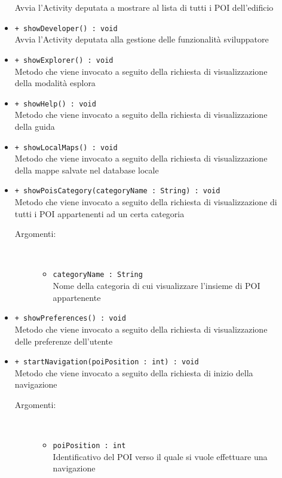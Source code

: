 \documentclass[../DefinizioneDiProdotto.tex]{subfiles}
\begin{document}
\begin{description}
\begin{itemize}
		Avvia l'Activity deputata a mostrare al lista di tutti i POI dell'edificio
		\item \texttt{+ showDeveloper() : void}\\
		Avvia l'Activity deputata alla gestione delle funzionalità sviluppatore
		\item \texttt{+ showExplorer() : void}\\
		Metodo che viene invocato a seguito della richiesta di visualizzazione della modalità esplora
		\item \texttt{+ showHelp() : void}\\
		Metodo che viene invocato a seguito della richiesta di visualizzazione della guida
		\item \texttt{+ showLocalMaps() : void}\\
		Metodo che viene invocato a seguito della richiesta di visualizzazione della mappe salvate nel database locale
		\item \texttt{+ showPoisCategory(categoryName : String) : void}\\
		Metodo che viene invocato a seguito della richiesta di visualizzazione di tutti i POI appartenenti ad un certa categoria
		\begin{description}
			\item[Argomenti:] \
			\begin{itemize}
				\item \texttt{categoryName : String}\\
				Nome della categoria di cui visualizzare l'insieme di POI appartenente\end{itemize}
		\end{description}
		\item \texttt{+ showPreferences() : void}\\
		Metodo che viene invocato a seguito della richiesta di visualizzazione delle preferenze dell'utente
		\item \texttt{+ startNavigation(poiPosition : int) : void}\\
		Metodo che viene invocato a seguito della richiesta di inizio della navigazione
		\begin{description}
			\item[Argomenti:] \
			\begin{itemize}
				\item \texttt{poiPosition : int}\\
				Identificativo del POI verso il quale si vuole effettuare una navigazione\end{itemize}
		\end{description}

\end{itemize}
\end{description}
\end{document}
